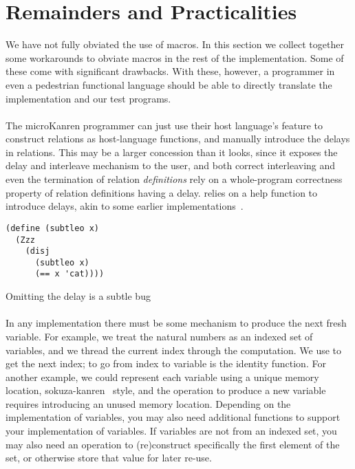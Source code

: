 \documentclass[sigplan,draft,balance,pbalance,natbib=false]{acmart}
\begin{document}
\section{Remainders and Practicalities}\label{sec:functional}

We have not fully obviated the use of macros. In this section we
collect together some workarounds to obviate macros in the rest of the
implementation. Some of these come with significant drawbacks. With
these, however, a programmer in even a pedestrian functional language
should be able to directly translate the implementation and our test
programs.

\paragraph{}

The microKanren programmer can just
use their host language's  feature to construct
relations as host-language functions, and manually introduce the
delays in relations. This may be a larger concession than it looks,
since it exposes the delay and interleave mechanism to the user, and
both correct interleaving and even the termination of relation
\emph{definitions} rely on a whole-program correctness property of
relation definitions having a delay.  relies on a
help function  to introduce delays, akin to some
earlier implementations~\cite{hemann2013muKanren}.

\begin{listing}
  \begin{verbatim}
(define (subtleo x)
  (Zzz
    (disj
      (subtleo x)
      (== x 'cat))))
  \end{verbatim}
  \caption{Omitting the delay is a subtle bug}
  \label{mnt:subtleo}
\end{listing}

\paragraph{}

In any implementation there must be
some mechanism to produce the next fresh variable. For example, we
treat the natural numbers as an indexed set of variables, and we
thread the current index through the computation. We use
 to get the next index; to go from index to variable
is the identity function. For another example, we could represent each
variable using a unique memory location,
sokuza-kanren~\cite{kiselyov2006taste} style, and the operation to
produce a new variable requires introducing an unused memory location.
Depending on the implementation of variables, you may also need
additional functions to support your implementation of variables. If
variables are not from an indexed set, you may also need an operation
to (re)construct specifically the first element of the set, or
otherwise store that value for later re-use.
\end{document}

